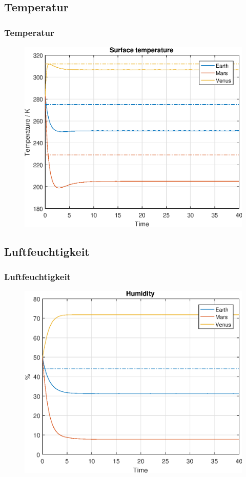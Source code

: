 \documentclass[ngerman]{beamer}
\begin{document}
\subsection{Temperatur}
\begin{frame}
	\frametitle{Temperatur}
		\begin{figure}
			\includegraphics[width=0.9\linewidth]{Matlab/figures/surfaceTemperature.eps}
		\end{figure}
\end{frame}

\subsection{Luftfeuchtigkeit}
\begin{frame}
	\frametitle{Luftfeuchtigkeit}
		\begin{figure}
			\includegraphics[width=0.9\linewidth]{Matlab/figures/humidity.eps}
		\end{figure}
\end{frame}
\end{document}
